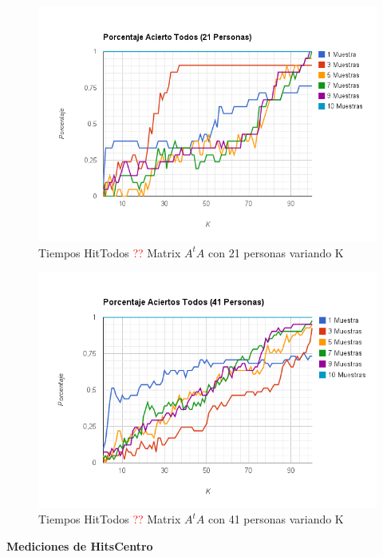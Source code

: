 \begin{figure}[H]
\includegraphics[width=1\textwidth]{img/imagek.png}
     \caption{Tiempos HitTodos \textcolor{red}{??} Matrix $A^tA$ con 21 personas variando K}
     \label{fig:figura1}
\end{figure}

\begin{figure}[H]
\includegraphics[width=1\textwidth]{img/imagel.png}
     \caption{Tiempos HitTodos \textcolor{red}{??} Matrix $A^tA$ con 41 personas variando K}
     \label{fig:figura1}
\end{figure}

\textbf{Mediciones de HitsCentro}

